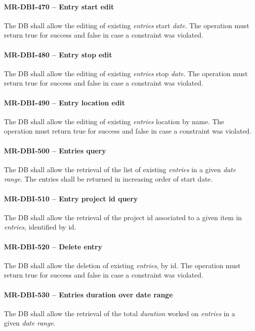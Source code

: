 \paragraph{MR-DBI-470 -- Entry start edit}
The \gls{DB} shall allow the editing of existing \emph{entries} start
\emph{date}.
The operation must return true for success and false in case a
constraint was violated.

\paragraph{MR-DBI-480 -- Entry stop edit}
The \gls{DB} shall allow the editing of existing \emph{entries} stop
\emph{date}.
The operation must return true for success and false in case a
constraint was violated.

\paragraph{MR-DBI-490 -- Entry location edit}
The \gls{DB} shall allow the editing of existing \emph{entries} location
by name.
The operation must return true for success and false in case a
constraint was violated.

\paragraph{MR-DBI-500 -- Entries query}
The \gls{DB} shall allow the retrieval of the list of existing \emph{entries}
in a given \emph{date range}. The entries shall be returned in
increasing order of start date.

\paragraph{MR-DBI-510 -- Entry project id query}
The \gls{DB} shall allow the retrieval of the project id associated to
a given item in \emph{entries}, identified by id.

\paragraph{MR-DBI-520 -- Delete entry}
The \gls{DB} shall allow the deletion of existing \emph{entries}, by id.
The operation must return true for success and false in case a
constraint was violated.

\paragraph{MR-DBI-530 -- Entries duration over date range}
The \gls{DB} shall allow the retrieval of the total \emph{duration} worked
on \emph{entries} in a given \emph{date range}.

